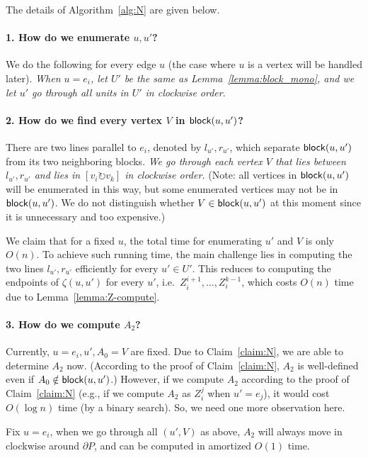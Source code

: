 \documentclass{ws-ijcga}
\begin{document}
The details of Algorithm~\ref{alg:N} are given below.

\paragraph{1. How do we enumerate $u,u'$?}
We do the following for every edge $u$ (the case where $u$ is a vertex will be handled later). \emph{When $u=e_i$,
let $U'$ be the same as Lemma~\ref{lemma:block_mono}, and we let $u'$ go through all units in $U'$ in clockwise order}.

\paragraph{2. How do we find every vertex $V$ in $\mathsf{block}(u,u')$?}
  There are two lines parallel to $e_i$, denoted by $l_{u'},r_{u'}$, which separate $\mathsf{block}(u,u')$ from its two neighboring blocks.
\emph{We go through each vertex $V$ that lies between $l_{u'},r_{u'}$ and lies in $[v_i\circlearrowright v_k]$ in clockwise order.}
(Note: all vertices in $\mathsf{block}(u,u')$ will be enumerated in this way, but some enumerated vertices may not be in $\mathsf{block}(u,u')$.
We do not distinguish whether $V\in \mathsf{block}(u,u')$ at this moment since it is unnecessary and too expensive.)

We claim that for a fixed $u$, the total time for enumerating $u'$ and $V$ is only $O(n)$.
To achieve such running time, the main challenge lies in computing the two lines $l_{u'},r_{u'}$ efficiently for every $u'\in U'$.
This reduces to computing the endpoints of $\zeta(u,u')$ for every $u'$, i.e.\ $Z_i^{i+1},\ldots,Z_i^{k-1}$,
  which costs $O(n)$ time due to Lemma~\ref{lemma:Z-compute}.

\paragraph{3. How do we compute $A_2$?} Currently, $u=e_i,u',A_0=V$ are fixed.
  Due to Claim~\ref{claim:N}, we are able to determine $A_2$ now.
  (According to the proof of Claim~\ref{claim:N}, $A_2$ is well-defined even if $A_0\notin \mathsf{block}(u,u')$.)
    However, if we compute $A_2$ according to the proof of Claim~\ref{claim:N} (e.g., if we compute $A_2$ as $Z_i^j$ when $u'=e_j$), it would cost $O(\log n)$ time (by a binary search).
So, we need one more observation here.

\begin{claim}
Fix $u=e_i$, when we go through all $(u',V)$ as above, $A_2$ will always move in clockwise around $\partial P$,
  and can be computed in amortized $O(1)$ time.
\end{claim}
\end{document}
